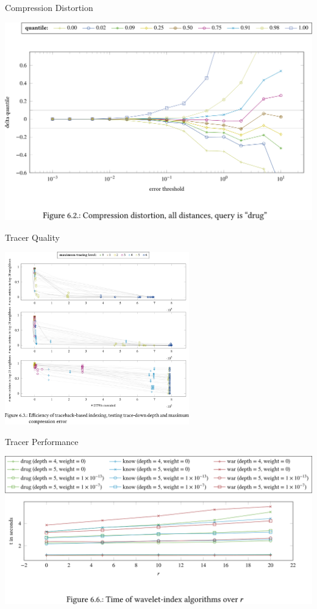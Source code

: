 \documentclass[14pt,t]{beamer}
\begin{document}
\begin{frame}[c]{Compression Distortion}
    \begin{center}
        \includegraphics[width = \textwidth]{img/backup-distortion2}
    \end{center}
\end{frame}
\begin{frame}[c]{Tracer Quality}
    \begin{center}
        \includegraphics[width = 0.6\textwidth]{img/backup-tracer}
    \end{center}
\end{frame}
\begin{frame}[c]{Tracer Performance}
    \begin{center}
        \includegraphics[width = \textwidth]{img/backup-perf-tracer}
    \end{center}
\end{frame}

\backupend
\end{document}
